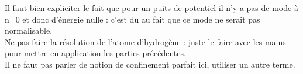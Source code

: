 \documentclass[12pt,prb,aps,epsf]{article}
\begin{document}
Il faut bien expliciter le fait que pour un puits de potentiel il n'y a pas de mode à n=0 et donc d'énergie nulle : c'est du au fait que ce mode ne serait pas normalisable.\\

Ne pas faire la résolution de l'atome d'hydrogène : juste le faire avec les mains pour mettre en application les parties précédentes.\\

Il ne faut pas parler de notion de confinement parfait ici, utiliser un autre terme.
	
\end{document}
